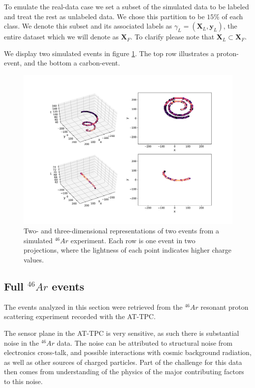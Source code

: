 To emulate the real-data case we set a subset of the simulated data to be labeled and treat the rest as unlabeled data. We chose this partition to be $15\%$ of each class. We denote this subset and its associated labels as $\gamma_L=(\mathbf{X}_L, \mathbf{y}_L)$, the entire dataset which we will denote as $\mathbf{X}_F$. To clarify please note that $\mathbf{X}_L \subset \mathbf{X}_F$.

We display two simulated events in figure \ref{fig:sim_samples}. The top row illustrates a proton-event, and the bottom a carbon-event. 

\begin{figure}[H]
\centering
\includegraphics[width=\textwidth]{../plots/display_eventssimulated.pdf}
\caption[Displaying simulated events in 2D and 3D]{Two- and three-dimensional representations of two events from a simulated ${}^{46}Ar$ experiment. Each row is one event in two projections, where the lightness of each point indicates higher charge values.}\label{fig:sim_samples}
\end{figure}


\subsection{Full \texorpdfstring{${}^{46}Ar$}{46Ar}  events}\label{sec:data_real}

The events analyzed in this section were retrieved from the ${}^{46}Ar$ resonant proton scattering experiment recorded with the AT-TPC. 

The sensor plane in the AT-TPC is very sensitive, as such there is substantial noise in the ${}^{46}Ar$ data. The noise can be attributed to structural noise from electronics cross-talk, and possible interactions with cosmic background radiation, as well as other sources of charged particles. Part of the challenge for this data then comes from understanding of the physics of the major contributing factors to this noise. 

